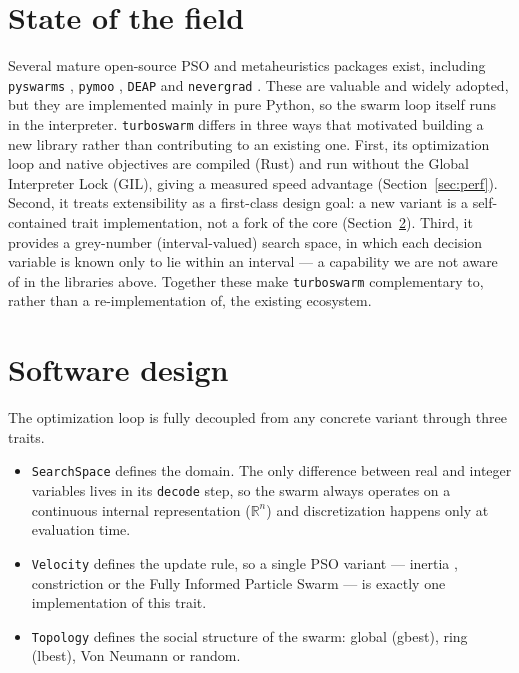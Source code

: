 \documentclass[11pt]{article}
\begin{document}
\section{State of the field}

Several mature open-source PSO and metaheuristics packages exist, including
\texttt{pyswarms} \citep{miranda2018pyswarms}, \texttt{pymoo}
\citep{blank2020pymoo}, \texttt{DEAP} \citep{fortin2012deap} and
\texttt{nevergrad} \citep{rapin2018nevergrad}. These are valuable and widely
adopted, but they are implemented mainly in pure Python, so the swarm loop
itself runs in the interpreter. \texttt{turboswarm} differs in three ways that
motivated building a new library rather than contributing to an existing one.
First, its optimization loop and native objectives are compiled (Rust) and run
without the Global Interpreter Lock (GIL), giving a measured speed advantage
(Section~\ref{sec:perf}). Second, it treats extensibility as a first-class
design goal: a new variant is a self-contained trait implementation, not a fork
of the core (Section~\ref{sec:design}). Third, it provides a grey-number
(interval-valued) search space, in which each decision variable is known only to
lie within an interval --- a capability we are not aware of in the libraries
above. Together these make \texttt{turboswarm} complementary to, rather than a
re-implementation of, the existing ecosystem.

\section{Software design}
\label{sec:design}

The optimization loop is fully decoupled from any concrete variant through three
traits.

\begin{itemize}
  \item \texttt{SearchSpace} defines the domain. The only difference between
  real and integer variables lives in its \texttt{decode} step, so the swarm
  always operates on a continuous internal representation
  ($\mathbb{R}^n$) and discretization happens only at evaluation time.
  \item \texttt{Velocity} defines the update rule, so a single PSO variant ---
  inertia \citep{shi1998modified}, constriction \citep{clerc2002particle} or the
  Fully Informed Particle Swarm \citep{mendes2004fully} --- is exactly one
  implementation of this trait.
  \item \texttt{Topology} defines the social structure of the swarm: global
  (gbest), ring (lbest), Von Neumann or random.
\end{itemize}
\end{document}
